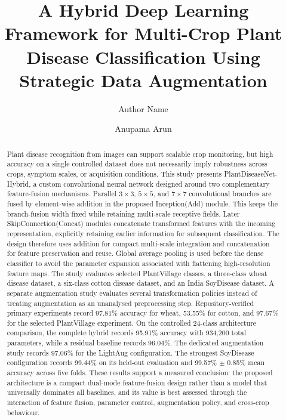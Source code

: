\documentclass[a4paper,fleqn]{cas-dc}
\begin{document}
\let\WriteBookmarks\relax

\title[mode=title]{A Hybrid Deep Learning Framework for Multi-Crop Plant Disease Classification Using Strategic Data Augmentation}

\author[1]{Author Name}
\author[1]{Anupama Arun}

\begin{abstract}
Plant disease recognition from images can support scalable crop monitoring, but high accuracy on a single controlled dataset does not necessarily imply robustness across crops, symptom scales, or acquisition conditions. This study presents PlantDiseaseNet-Hybrid, a custom convolutional neural network designed around two complementary feature-fusion mechanisms. Parallel $3\times3$, $5\times5$, and $7\times7$ convolutional branches are fused by element-wise addition in the proposed Inception(Add) module. This keeps the branch-fusion width fixed while retaining multi-scale receptive fields. Later SkipConnection(Concat) modules concatenate transformed features with the incoming representation, explicitly retaining earlier information for subsequent classification. The design therefore uses addition for compact multi-scale integration and concatenation for feature preservation and reuse. Global average pooling is used before the dense classifier to avoid the parameter expansion associated with flattening high-resolution feature maps. The study evaluates selected PlantVillage classes, a three-class wheat disease dataset, a six-class cotton disease dataset, and an India SoyDisease dataset. A separate augmentation study evaluates several transformation policies instead of treating augmentation as an unanalysed preprocessing step. Repository-verified primary experiments record 97.81\% accuracy for wheat, 53.55\% for cotton, and 97.67\% for the selected PlantVillage experiment. On the controlled 24-class architecture comparison, the complete hybrid records 95.91\% accuracy with 934,200 total parameters, while a residual baseline records 96.04\%. The dedicated augmentation study records 97.06\% for the LightAug configuration. The strongest SoyDisease configuration records 99.44\% on its held-out evaluation and 99.57\% $\pm$ 0.85\% mean accuracy across five folds. These results support a measured conclusion: the proposed architecture is a compact dual-mode feature-fusion design rather than a model that universally dominates all baselines, and its value is best assessed through the interaction of feature fusion, parameter control, augmentation policy, and cross-crop behaviour.
\end{abstract}
\end{document}
